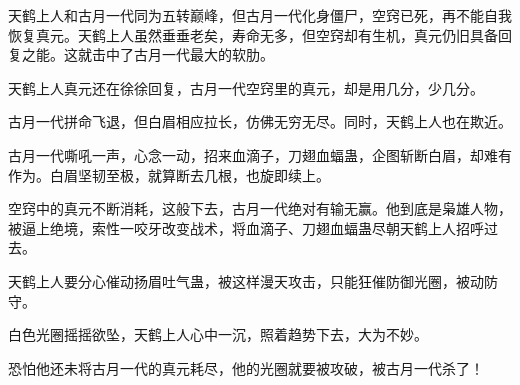 \begin{this_body}
天鹤上人和古月一代同为五转巅峰，但古月一代化身僵尸，空窍已死，再不能自我恢复真元。天鹤上人虽然垂垂老矣，寿命无多，但空窍却有生机，真元仍旧具备回复之能。这就击中了古月一代最大的软肋。

天鹤上人真元还在徐徐回复，古月一代空窍里的真元，却是用几分，少几分。

古月一代拼命飞退，但白眉相应拉长，仿佛无穷无尽。同时，天鹤上人也在欺近。

古月一代嘶吼一声，心念一动，招来血滴子，刀翅血蝠蛊，企图斩断白眉，却难有作为。白眉坚韧至极，就算断去几根，也旋即续上。

空窍中的真元不断消耗，这般下去，古月一代绝对有输无赢。他到底是枭雄人物，被逼上绝境，索性一咬牙改变战术，将血滴子、刀翅血蝠蛊尽朝天鹤上人招呼过去。

天鹤上人要分心催动扬眉吐气蛊，被这样漫天攻击，只能狂催防御光圈，被动防守。

白色光圈摇摇欲坠，天鹤上人心中一沉，照着趋势下去，大为不妙。

恐怕他还未将古月一代的真元耗尽，他的光圈就要被攻破，被古月一代杀了！

\end{this_body}

